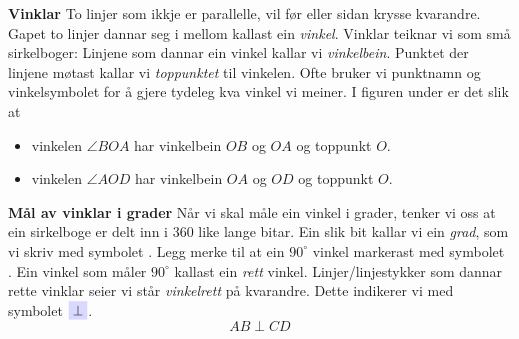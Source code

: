 \textbf{Vinklar} \label{vinklar}\os
To linjer som ikkje er parallelle, vil før eller sidan krysse kvarandre. Gapet to linjer dannar seg i mellom kallast ein \textit{vinkel}. Vinklar teiknar vi som små sirkelboger:
Linjene som dannar ein vinkel kallar vi \textit{vinkelbein}. Punktet der linjene møtast kallar vi \textit{toppunktet} til vinkelen. Ofte bruker vi punktnamn og vinkelsymbolet \sym{$ \angle $} for å gjere tydeleg kva vinkel vi meiner. I figuren under er det slik at
\begin{itemize}
\item vinkelen $ \angle BOA $  har vinkelbein $ OB $ og $ OA $ og toppunkt $ O $.
\item vinkelen $ \angle AOD $  har vinkelbein $ OA $ og $ OD $ og toppunkt $ O $.	
\end{itemize}
\newpage
\textbf{Mål av vinklar i grader}\os
Når vi skal måle ein vinkel i grader, tenker vi oss at ein sirkelboge er delt inn i 360 like lange bitar. Ein slik bit kallar vi ein \textit{grad}, som vi skriv med symbolet \sym{$ ^\circ $}. 
 \vsk
Legg merke til at ein $ 90^\circ $ vinkel markerast med symbolet \sym{$ \square $}. Ein vinkel som måler $ 90^\circ $ kallast ein \textit{rett} vinkel. Linjer/linjestykker som dannar rette vinklar seier vi står \textit{vinkelrett} på kvarandre. Dette indikerer vi med symbolet $ \sym{$ \perp $} $.
\[ AB\perp CD \]
\newpage
{}\vsk
\label{vinkelend}
\newpage
{}

